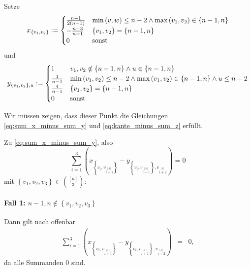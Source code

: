 \documentclass[10p,a4paper,BCOR = 12mm, DIV=15]{scrbook}
\begin{document}
\begin{bew}
Setze
\begin{displaymath}
x_{\left\{v_1, v_2\right\}} := \begin{cases}
\frac{n+1}{2\left(n-1\right)} & \min\left(v, w\right) \leq n-2 \wedge \max\left(v_1, v_2\right)\in \left\{n-1, n\right\} \\
-\frac{n-3}{n-1} & \left\{v_1, v_2\right\} = \left\{n-1, n\right\} \\
0 & \textnormal{sonst}
\end{cases}
\end{displaymath}
und
\begin{displaymath}
y_{\left\{v_1, v_2\right\}, u} := \begin{cases}
1 & v_1, v_2\notin \left\{n-1, n\right\} \wedge u\in \left\{n-1, n\right\} \\
\frac{1}{n-1} & \min\left(v_1, v_2\right) \leq n-2 \wedge \max\left(v_1, v_2\right)\in \left\{n-1, n\right\} \wedge u\leq n-2 \\
\frac{4}{n-1} & \left\{v_1, v_2\right\} = \left\{n-1, n\right\} \\
0 & \textnormal{sonst}
\end{cases}
\end{displaymath}

Wir müssen zeigen, dass dieser Punkt die Gleichungen \eqref{eq:sum_x_minus_sum_y} und \eqref{eq:kante_minus_sum_z} erfüllt.

Zu \eqref{eq:sum_x_minus_sum_y}, also
\begin{displaymath}
\sum_{i=1}^3 \left(x_{\left\{v_{i}, v_{i \stackrel{\left[3\right]}{+} 1}\right\}} - y_{\left\{v_{i}, v_{i \stackrel{\left[3\right]}{+} 1}\right\}, v_{i \stackrel{\left[3\right]}{+} 2}}\right) = 0
\end{displaymath}
mit $\left\{v_1, v_2, v_3\right\} \in {\left[n\right] \choose 3}$:

\paragraph{Fall 1: $n-1, n\notin \left\{v_1, v_2, v_3\right\}$} Dann gilt nach offenbar
\begin{eqnarray*}
\sum_{i=1}^3 \left(x_{\left\{v_{i}, v_{i \stackrel{\left[3\right]}{+} 1}\right\}} -  y_{\left\{v_{i}, v_{i \stackrel{\left[3\right]}{+} 1}\right\}, v_{i \stackrel{\left[3\right]}{+} 2}}\right) & = & 0,
\end{eqnarray*}
da alle Summanden $0$ sind.


\end{bew}
\end{document}
